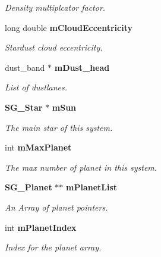 \begin{CompactItemize}
\begin{CompactList}\small\item\em Density multiplcator factor. \item\end{CompactList}\item 
long double {\bf m\-Cloud\-Eccentricity}\label{class_s_g___stardust_p7}

\begin{CompactList}\small\item\em Stardust cloud eccentricity. \item\end{CompactList}\item 
dust\_\-band $\ast$ {\bf m\-Dust\_\-head}\label{class_s_g___stardust_p8}

\begin{CompactList}\small\item\em List of dustlanes. \item\end{CompactList}\item 
{\bf SG\_\-Star} $\ast$ {\bf m\-Sun}\label{class_s_g___stardust_p9}

\begin{CompactList}\small\item\em The main star of this system. \item\end{CompactList}\item 
int {\bf m\-Max\-Planet}\label{class_s_g___stardust_p10}

\begin{CompactList}\small\item\em The max number of planet in this system. \item\end{CompactList}\item 
{\bf SG\_\-Planet} $\ast$$\ast$ {\bf m\-Planet\-List}\label{class_s_g___stardust_p11}

\begin{CompactList}\small\item\em An Array of planet pointers. \item\end{CompactList}\item 
int {\bf m\-Planet\-Index}\label{class_s_g___stardust_p12}

\begin{CompactList}\small\item\em Index for the planet array. \item\end{CompactList}\end{CompactItemize}


